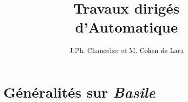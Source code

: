 

\textheight=660pt 
\textwidth=470pt 
\topmargin=-27pt 
\oddsidemargin=0pt 
\evensidemargin=0pt 
\title{Travaux dirig\'es\\d'Automatique}
\author{J.Ph. Chancelier et M. Cohen de Lara}


\maketitle 
\def\cmarg{\hspace{1cm}}


\section{G\'en\'eralit\'es sur {\em Basile}}

